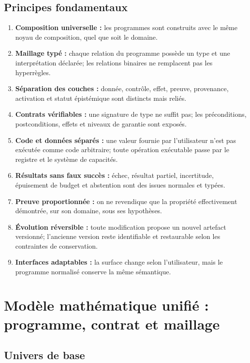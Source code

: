 \documentclass[11pt,a4paper,openany]{book}
\theoremstyle{definition}
\theoremstyle{plain}
\theoremstyle{remark}
\begin{document}
\chapter{Principes fondamentaux}
\begin{enumerate}
\item \textbf{Composition universelle :} les programmes sont construits avec le même noyau de composition, quel que soit le domaine.
\item \textbf{Maillage typé :} chaque relation du programme possède un type et une interprétation déclarée; les relations binaires ne remplacent pas les hyperrègles.
\item \textbf{Séparation des couches :} donnée, contrôle, effet, preuve, provenance, activation et statut épistémique sont distincts mais reliés.
\item \textbf{Contrats vérifiables :} une signature de type ne suffit pas; les préconditions, postconditions, effets et niveaux de garantie sont exposés.
\item \textbf{Code et données séparés :} une valeur fournie par l'utilisateur n'est pas exécutée comme code arbitraire; toute opération exécutable passe par le registre et le système de capacités.
\item \textbf{Résultats sans faux succès :} échec, résultat partiel, incertitude, épuisement de budget et abstention sont des issues normales et typées.
\item \textbf{Preuve proportionnée :} on ne revendique que la propriété effectivement démontrée, sur son domaine, sous ses hypothèses.
\item \textbf{Évolution réversible :} toute modification propose un nouvel artefact versionné; l'ancienne version reste identifiable et restaurable selon les contraintes de conservation.
\item \textbf{Interfaces adaptables :} la surface change selon l'utilisateur, mais le programme normalisé conserve la même sémantique.
\end{enumerate}

\part{Modèle mathématique unifié : programme, contrat et maillage}
\chapter{Univers de base}
\end{document}
